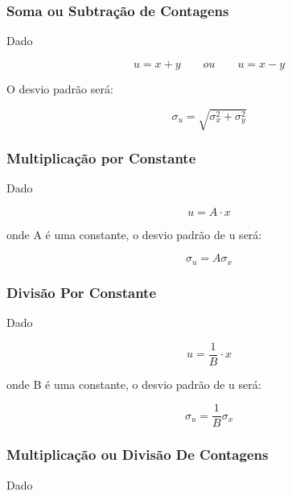 \documentclass[11pt,a4paper]{article}
\begin{document}
		
	\subsubsection*{Soma ou Subtração de Contagens}

		Dado 

			\begin{equation*}
				u = x + y \qquad ou \qquad u = x - y
			\end{equation*}


		\noindent O desvio padrão será:

			\begin{equation}
				\sigma_u = \sqrt{\sigma_x^2 + \sigma_y^2} 
			\end{equation}
		
	\subsubsection*{Multiplicação por Constante}

		Dado 

			\begin{equation*}
				u = A \cdot x
			\end{equation*}

		\noindent onde A é uma constante, o desvio padrão de u será:

			\begin{equation}
				\sigma_u = A \sigma_x
			\end{equation}

	\subsubsection*{Divisão Por Constante}

		Dado 

			\begin{equation*}
				u =\frac{1}{B} \cdot x
			\end{equation*}

		\noindent onde B é uma constante, o desvio padrão de u será:

			\begin{equation}
				\sigma_u = \frac{1}{B} \sigma_x
			\end{equation}
		
	\subsubsection*{Multiplicação ou Divisão De Contagens}

		Dado 
\end{document}
